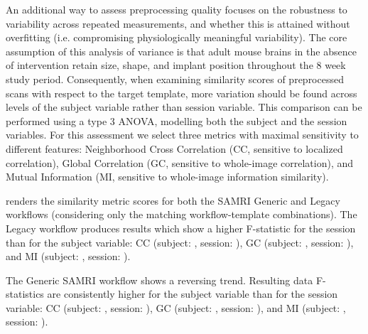 An additional way to assess preprocessing quality focuses on the robustness to variability across repeated measurements, and whether this is attained without overfitting (i.e. compromising physiologically meaningful variability).
The core assumption of this analysis of variance is that adult mouse brains in the absence of intervention retain size, shape, and implant position throughout the 8 week study period.
Consequently, when examining similarity scores of preprocessed scans with respect to the target template, more variation should be found across levels of the subject variable rather than session variable.
This comparison can be performed using a type 3 ANOVA, modelling both the subject and the session variables.
For this assessment we select three metrics with maximal sensitivity to different features:
Neighborhood Cross Correlation (CC, sensitive to localized correlation),
Global Correlation (GC, sensitive to whole-image correlation),
and Mutual Information (MI, sensitive to whole-image information similarity).

 renders the similarity metric scores for both the SAMRI Generic and Legacy workflows (considering only the matching workflow-template combinations).
The Legacy workflow produces results which show a higher F-statistic for the session than for the subject variable:
CC (subject: , session: ),
GC (subject: , session: ),
and MI (subject: , session: ).

The Generic SAMRI workflow shows a reversing trend.
Resulting data F-statistics are consistently higher for the subject variable than for the session variable:
CC (subject: , session: ),
GC (subject: , session: ),
and MI (subject: , session: ).

\fi